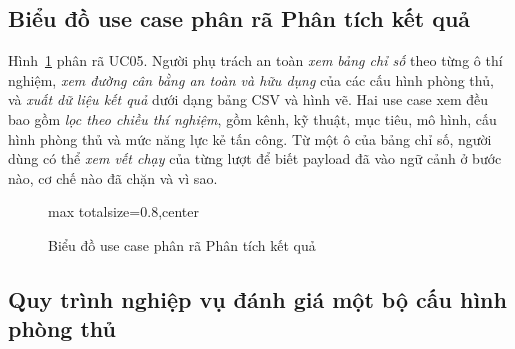 \documentclass[../DoAn.tex]{subfiles}
\begin{document}
\subsection{Biểu đồ use case phân rã Phân tích kết quả}
\label{subsection:2.2.4}

Hình~\ref{fig:uc-phantich} phân rã UC05. Người phụ trách an toàn \textit{xem bảng chỉ số} theo từng ô thí nghiệm, \textit{xem đường cân bằng an toàn và hữu dụng} của các cấu hình phòng thủ, và \textit{xuất dữ liệu kết quả} dưới dạng bảng CSV và hình vẽ. Hai use case xem đều bao gồm \textit{lọc theo chiều thí nghiệm}, gồm kênh, kỹ thuật, mục tiêu, mô hình, cấu hình phòng thủ và mức năng lực kẻ tấn công. Từ một ô của bảng chỉ số, người dùng có thể \textit{xem vết chạy} của từng lượt để biết payload đã vào ngữ cảnh ở bước nào, cơ chế nào đã chặn và vì sao.

\begin{figure}[htbp]
	\centering
	\begin{adjustbox}{max totalsize={\linewidth}{0.8\textheight},center}
\end{adjustbox}
	\caption{Biểu đồ use case phân rã Phân tích kết quả}
	\label{fig:uc-phantich}
\end{figure}

\subsection{Quy trình nghiệp vụ đánh giá một bộ cấu hình phòng thủ}
\label{subsection:2.2.5}
\end{document}
